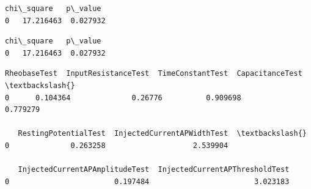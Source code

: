             \begin{tcolorbox}
\begin{Verbatim}[commandchars=\\\{\}]
   chi\_square   p\_value
0   17.216463  0.027932
\end{Verbatim}
\end{tcolorbox}
        
    

            \begin{tcolorbox}[breakable, size=fbox, boxrule=.5pt, pad at break*=1mm, opacityfill=0]
\begin{Verbatim}[commandchars=\\\{\}]
   chi\_square   p\_value
0   17.216463  0.027932
\end{Verbatim}
\end{tcolorbox}
        
            \begin{tcolorbox}[breakable, size=fbox, boxrule=.5pt, pad at break*=1mm, opacityfill=0]
\begin{Verbatim}[commandchars=\\\{\}]
   RheobaseTest  InputResistanceTest  TimeConstantTest  CapacitanceTest  \textbackslash{}
0      0.104364              0.26776          0.909698         0.779279

   RestingPotentialTest  InjectedCurrentAPWidthTest  \textbackslash{}
0              0.263258                    2.539904

   InjectedCurrentAPAmplitudeTest  InjectedCurrentAPThresholdTest
0                        0.197484                        3.023183
\end{Verbatim}
\end{tcolorbox}
        
